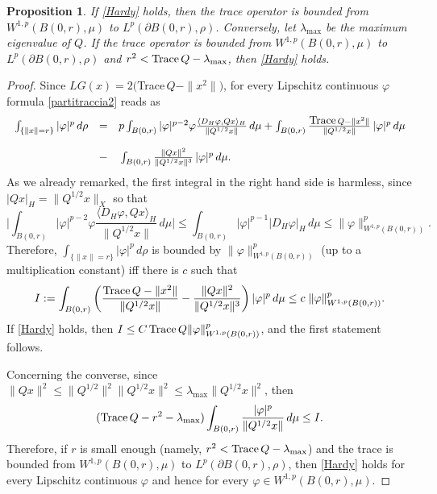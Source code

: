 \documentclass[reqno,twoside,12pt]{amsart}
\newtheorem{Proposition}[Theorem]{Proposition}
\begin{document}
 
\begin{Proposition}
If \eqref{Hardy} holds, then the trace operator is bounded from $W^{1,p}(B(0,r), \mu)$ to   $L^{p}(\partial B(0,r), \rho)$. Conversely, let $\lambda_{\max}$ be the maximum eigenvalue of $Q$. 
If the trace operator is bounded from $W^{1,p}(B(0,r), \mu)$ to   $L^{p}(\partial B(0,r), \rho)$ and $r^2 < \mbox{\rm Trace}\,Q   - \lambda_{\max}$, then 
\eqref{Hardy} holds. 
\end{Proposition}
\begin{proof}
Since  $LG(x) = 2($Trace$\,Q - \|x^2\|)$, for every Lipschitz continuous $\varphi$  formula \eqref{partitraccia2} reads as 
\begin{equation}
\label{sfera}
\begin{array}{lll}
{\displaystyle}  \int_{\{\|x\|=r\}}  | \varphi|^p   \,d\rho  &= & {\displaystyle}  p \int_{B(0,r)} |\varphi|^{p-2} \varphi \frac{\langle D_H\varphi, Qx \rangle_H }{\|Q^{1/2}x\|}  \,d\mu +  \int_{B(0,r)} \frac{ \mbox{\rm Trace}\,Q - \|x^2\|}{\|Q^{1/2}x\|} \,| \varphi|^p \,d\mu 
\\
\\
& -  &{\displaystyle}  \int_{B(0,r)} \frac{\|Qx\|^2}{\|Q^{1/2}x\|^3} \,| \varphi|^p \,d\mu .
\end{array}
\end{equation}
As we already remarked, the first integral in the right hand side is harmless, since $ |Qx |_H= \|Q^{1/2}x\|_X$ so that 
$$\bigg|\int_{B(0,r)}  |\varphi|^{p-2} \varphi \frac{\langle D_H\varphi, Qx \rangle_H }{\|Q^{1/2}x\|}  \,d\mu\bigg| \leq 
\int_{B(0,r)}  |\varphi|^{p-1} |D_H\varphi|_H \,d\mu \leq  \|\varphi\|_{W^{1,p}(B(0,r))}^p .$$
Therefore, $ \int_{\{\|x\|=r\}}  | \varphi|^p   \,d\rho$ is bounded by  $\|\varphi\|_{W^{1,p}(B(0,r))}^p$ (up to a multiplication constant) iff there is $c$ such that 
$$I:=  \int_{B(0,r)} \bigg( \frac{ \mbox{\rm Trace}\,Q - \|x^2\|}{\|Q^{1/2}x\|} - \frac{\|Qx\|^2}{\|Q^{1/2}x\|^3} \bigg)\,| \varphi|^p \,d\mu \leq c\;\|\varphi\|_{W^{1,p}(B(0,r))}^p.$$
If \eqref{Hardy} holds,  then $I\leq C\,\mbox{\rm Trace}\,Q\|\varphi\|_{W^{1,p}(B(0,r))}^p$, and the first statement follows. 

Concerning the converse, since $\|Qx\|^2\leq \|Q^{1/2}\|^2 \|Q^{1/2}x\|^2\leq \lambda_{\max}\|Q^{1/2}x\|^2$, 
then 
$$ ( \mbox{\rm Trace}\,Q - r^2 - \lambda_{\max}) \int_{B(0,r)}\frac{|\varphi|^p}{ \|Q^{1/2}x\|} \,d\mu \leq I.$$
Therefore, if $r$ is small enough (namely, $r^2 < \mbox{\rm Trace}\,Q   - \lambda_{\max}$) and the trace is bounded from $W^{1,p}(B(0,r),  \mu)$ to   $L^{p}(\partial B(0,r), \rho)$, then  \eqref{Hardy} holds for every Lipschitz continuous $\varphi$ and hence for every $\varphi \in W^{1,p}(B(0,r), \mu)$. \end{proof}
\end{document}
